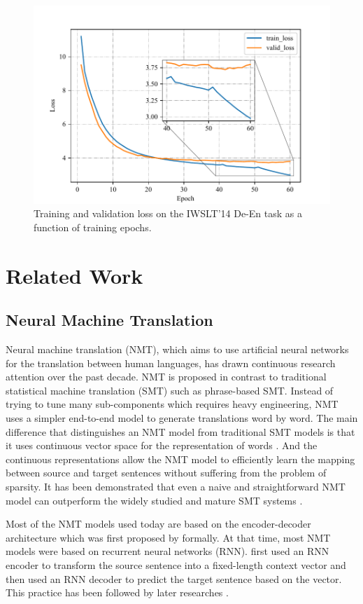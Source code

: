 \documentclass[review]{elsarticle}
\begin{document}
\begin{figure}[ht]
    \centering
    \includegraphics[width=\columnwidth]{loss}
    \caption{Training and validation loss on the IWSLT'14 De-En task as a function of training epochs.}
    \label{fig:loss}
\end{figure}

\section{Related Work}
\label{sec:related}
\subsection{Neural Machine Translation} 
Neural machine translation (NMT), which aims to use artificial neural networks for the translation between human languages, has drawn continuous research attention over the past decade. 
NMT is proposed in contrast to traditional statistical machine translation (SMT) such as phrase-based SMT. Instead of trying to tune many sub-components which requires heavy engineering, NMT uses a simpler end-to-end model to generate translations word by word. The main difference that distinguishes an NMT model from traditional SMT models is that it uses continuous vector space for the representation of words \cite{Kalchbrenner13}. And the continuous representations allow the NMT model to efficiently learn the mapping between source and target sentences without suffering from the problem of sparsity. It has been demonstrated that even a naive and straightforward NMT model can outperform the widely studied and mature SMT systems \cite{Sutskever14}.

Most of the NMT models used today are based on the encoder-decoder architecture which was first proposed by \citet{Cho14a} formally. 
At that time, most NMT models were based on recurrent neural networks (RNN).
\citet{Cho14a} first used an RNN encoder to transform the source sentence into a fixed-length context vector and then used an RNN decoder to predict the target sentence based on the vector. 
This practice has been followed by later researches \cite{Luong15a, Cho14b}.
\end{document}
